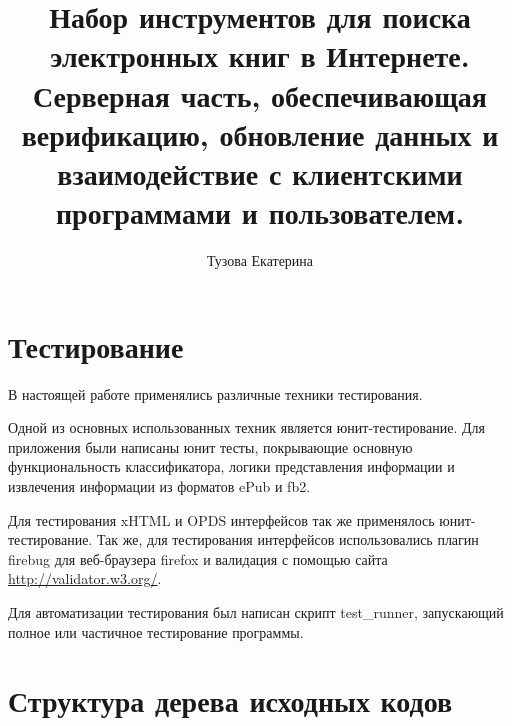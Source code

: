 \documentclass[a4paper]{article}
\begin{document}
\author{Тузова Екатерина}
\title{Набор инструментов для поиска электронных книг в Интернете. Серверная часть, обеспечивающая верификацию, обновление данных и взаимодействие с клиентскими программами и пользователем.}
\maketitle



\mbox{}\vspace{-2.8cm}
\tableofcontents
\newpage











\section{Тестирование}

В настоящей работе применялись различные техники тестирования. 

Одной из основных использованных техник является юнит-тестирование. Для приложения были написаны юнит тесты, покрывающие основную функциональность классификатора, логики представления информации и извлечения информации из форматов ePub и fb2. 

Для тестирования xHTML и OPDS интерфейсов так же применялось юнит-тестирование. Так же, для тестирования интерфейсов использовались плагин firebug\cite{firebug} для веб-браузера	firefox и валидация с помощью сайта \url{http://validator.w3.org/}. 

Для автоматизации тестирования был написан скрипт test\_runner,	 запускающий полное или частичное тестирование программы.





\appendix
\section{Структура дерева исходных кодов}
\end{document}
